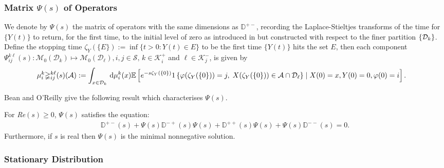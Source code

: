 \subsubsection{Matrix $\mathbb\Psi(s)$ of Operators}\label{sec: intro Psi}
We denote by $\mathbb \Psi(s)$ the matrix of operators with the same dimensions as \(\mathbb D^{+-}\), recording the Laplace-Stieltjes transforms of the time for $\{Y(t)\}$ to return, for the first time, to the initial level of zero as introduced in \citep{bo2014} but constructed with respect to the finer partition \(\{\mathcal{D}_k\}\). Define the stopping time $\zeta_Y(\{E\}):= \inf \{t > 0: Y(t) \in E\}$ to be the first time $\{Y(t)\}$ hits the set $E$, then each component $\mathbb \Psi_{ij}^{k\ell}(s): \mathcal{M}_0(\mathcal D_k) \mapsto \mathcal{M}_0(\mathcal D_\ell), i,j \in \mathcal{S},\,k\in\mathcal K_i^+$ and $\ell \in \mathcal K_j^-$, is given by  
% 
\begin{align*} 
	 \mu_i^{k}\mathbb\Psi_{ij}^{k\ell}(s) (\mathcal{A}) 
	& := \int_{x \in \mathcal{D}_k} \, \mathrm{d} \mu_i^k(x)
	 \mathbb{E}\left[e^{-s\zeta_Y(\{0\})}1\left\{\varphi({\zeta_Y(\{0\})}) = j, \; X({\zeta_Y(\{0\})}) \in \mathcal{A}\cap\mathcal{D}_\ell\right\} \mid X(0) = x, Y(0) = 0, \varphi(0) = i\right].
\end{align*} 

Bean and O'Reilly \cite[Theorem~1]{bo2014} give the following result which characterises \(\mathbb\Psi(s)\).
\begin{theo} 
	\label{theo:Psi} 
	For \textit{Re}$(s) \geq 0$, $\mathbb\Psi(s)$ satisfies the  equation: 
	\begin{align*} 
		\mathbb{D}^{+-}(s) + \mathbb\Psi(s)\mathbb{D}^{-+}(s)\mathbb\Psi(s) + \mathbb{D}^{++}(s)\mathbb\Psi(s) + \mathbb\Psi(s)\mathbb{D}^{--}(s) = 0. 
	\end{align*} 
	Furthermore, if $s$ is real then $\mathbb\Psi(s)$ is the minimal nonnegative solution. 
\end{theo} 

\subsubsection{Stationary Distribution} 

